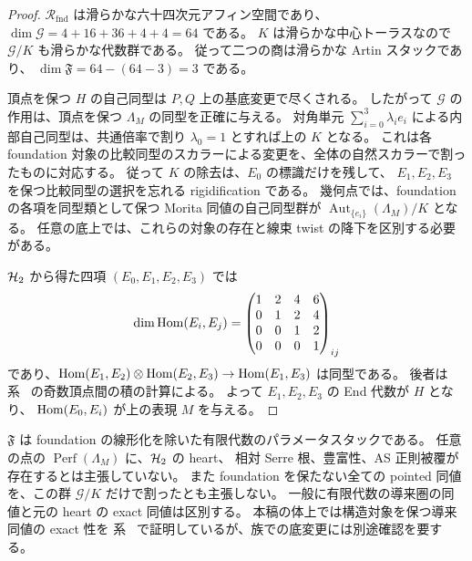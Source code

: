\begin{proof}
$\mathcal R_{\mathrm{fnd}}$ は滑らかな六十四次元アフィン空間であり、
$\dim\mathcal G=4+16+36+4+4=64$ である。
$K$ は滑らかな中心トーラスなので $\mathcal G/K$ も滑らかな代数群である。
従って二つの商は滑らかな Artin スタックであり\cite[Tag 0DLS]{StacksModuli}、
$\dim\mathfrak F=64-(64-3)=3$ である。

頂点を保つ $H$ の自己同型は $P,Q$ 上の基底変更で尽くされる。
したがって $\mathcal G$ の作用は、頂点を保つ $\Lambda_M$ の同型を正確に与える。
対角単元 $\sum_{i=0}^3\lambda_i e_i$ による内部自己同型は、共通倍率で割り
$\lambda_0=1$ とすれば上の $K$ となる。
これは各 foundation 対象の比較同型のスカラーによる変更を、全体の自然スカラーで割ったものに対応する。
従って $K$ の除去は、$E_0$ の標識だけを残して、
$E_1,E_2,E_3$ を保つ比較同型の選択を忘れる rigidification である。
幾何点では、foundation の各項を同型類として保つ Morita 同値の自己同型群が
$\operatorname{Aut}_{\{e_i\}}(\Lambda_M)/K$ となる。
任意の底上では、これらの対象の存在と線束 twist の降下を区別する必要がある。

$\mathcal H_2$ から得た四項 $(E_0,E_1,E_2,E_3)$ では
\[
 \dim\operatorname{Hom}(E_i,E_j)=
 \begin{pmatrix}
 1&2&4&6\\0&1&2&4\\0&0&1&2\\0&0&0&1
 \end{pmatrix}_{ij}
\]
であり、$\operatorname{Hom}(E_1,E_2)\otimes\operatorname{Hom}(E_2,E_3)\to\operatorname{Hom}(E_1,E_3)$ は同型である。
後者は系~\cite[\texttt{cor:normal-cubic-defect}]{QuadricIntrinsic2026} の奇数頂点間の積の計算による。
よって $E_1,E_2,E_3$ の End 代数が $H$ となり、
$\operatorname{Hom}(E_0,E_i)$ が上の表現 $M$ を与える。
\end{proof}

\begin{remark}
$\mathfrak F$ は foundation の線形化を除いた有限代数のパラメータスタックである。
任意の点の $\operatorname{Perf}(\Lambda_M)$ に、$\mathcal H_2$ の heart、
相対 Serre 根、豊富性、AS 正則被覆が存在するとは主張していない。
また foundation を保たない全ての pointed 同値を、この群 $\mathcal G/K$ だけで割ったとも主張しない。
一般に有限代数の導来圏の同値と元の heart の exact 同値は区別する。
本稿の体上では構造対象を保つ導来同値の exact 性を
系~\cite[\texttt{cor:pointed-derived-exact}]{QuadricIntrinsic2026} で証明しているが、族での底変更には別途確認を要する。
\end{remark}

